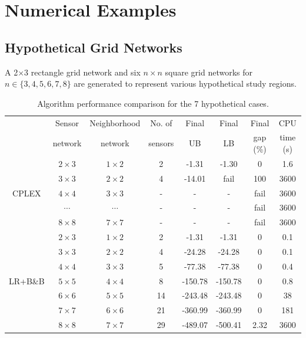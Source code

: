 \section{Numerical Examples}\label{sensor:numerical}

\subsection{Hypothetical Grid Networks} \label{sensor:hypothetical}

A 2$\times$3 rectangle grid network and six $n\times n$ square grid networks for $n\in\{3,4,5,6,7,8\}$ are generated to represent various hypothetical study regions. 

\begin{table}[htbp]
  \centering
  \footnotesize
  \caption{Algorithm performance comparison for the 7 hypothetical cases.}
    \begin{tabular}{cccccccc}
    \toprule
     & Sensor  & Neighborhood  & No. of   & Final  & Final  & Final     & CPU      \\
     & network & network       & sensors  & UB     & LB     & gap (\%)  & time (s) \\
    \midrule
    \multirow{5}[2]{*}{CPLEX} 
          & $2\times3$  & $1\times2$  & 2   & -1.31    & -1.30    & 0     & 1.6   \\
          & $3\times3$  & $2\times2$  & 4   & -14.01   & fail     & 100   & 3600  \\
          & $4\times4$  & $3\times3$  & -   & -        & -        & fail  & 3600  \\
          & $\cdots$    & $\cdots$    & -   & -        & -        & fail  & 3600  \\
          & $8\times8$  & $7\times7$  & -   & -        & -        & fail  & 3600  \\
    \midrule
    \multirow{7}[2]{*}{LR+B\&B}
          & $2\times3$  & $1\times2$  & 2   & -1.31    & -1.31    & 0     & 0.1   \\
          & $3\times3$  & $2\times2$  & 4   & -24.28   & -24.28   & 0     & 0.1   \\
          & $4\times4$  & $3\times3$  & 5   & -77.38   & -77.38   & 0     & 0.4   \\
          & $5\times5$  & $4\times4$  & 8   & -150.78  & -150.78  & 0     & 0.8   \\
          & $6\times6$  & $5\times5$  & 14  & -243.48  & -243.48  & 0     & 38    \\
          & $7\times7$  & $6\times6$  & 21  & -360.99  & -360.99  & 0     & 181   \\
          & $8\times8$  & $7\times7$  & 29  & -489.07  & -500.41  & 2.32  & 3600  \\
    \bottomrule
    \end{tabular}%
  \label{tab:sensor-casestudy-stat}%
\end{table}%
